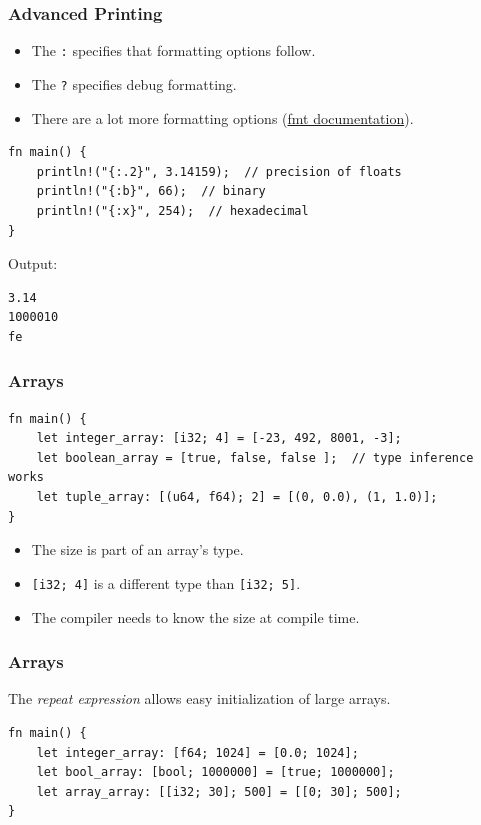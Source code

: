 \begin{frame}[fragile]
    \frametitle{Advanced Printing}
    \begin{itemize}
        \item The \texttt{:} specifies that formatting options follow.
        \item The \texttt{?} specifies debug formatting.
        \item There are a lot more formatting options (\href{https://doc.rust-lang.org/std/fmt/}{fmt documentation}).
    \end{itemize}
    \pause
    \vfill
    \begin{verbatim}
fn main() {
    println!("{:.2}", 3.14159);  // precision of floats
    println!("{:b}", 66);  // binary
    println!("{:x}", 254);  // hexadecimal
}
    \end{verbatim}
    Output:
    \begin{verbatim}
3.14
1000010
fe
    \end{verbatim}
\end{frame}

\begin{frame}[fragile]
    \frametitle{Arrays}
    \begin{verbatim}
fn main() {
    let integer_array: [i32; 4] = [-23, 492, 8001, -3];
    let boolean_array = [true, false, false ];  // type inference works
    let tuple_array: [(u64, f64); 2] = [(0, 0.0), (1, 1.0)];
}
    \end{verbatim}
    \pause
    \vfill
    \begin{itemize}
        \item The size is part of an array's type.
        \item \texttt{[i32; 4]} is a different type than \texttt{[i32; 5]}.
        \pause
        \vfill
        \item The compiler needs to know the size at compile time.
    \end{itemize}
\end{frame}

\begin{frame}[fragile]
    \frametitle{Arrays}
    The \textit{repeat expression} allows easy initialization of large arrays.
    \pause
    \vfill
    \begin{verbatim}
fn main() {
    let integer_array: [f64; 1024] = [0.0; 1024];
    let bool_array: [bool; 1000000] = [true; 1000000];
    let array_array: [[i32; 30]; 500] = [[0; 30]; 500];
}
    \end{verbatim}
\end{frame}

